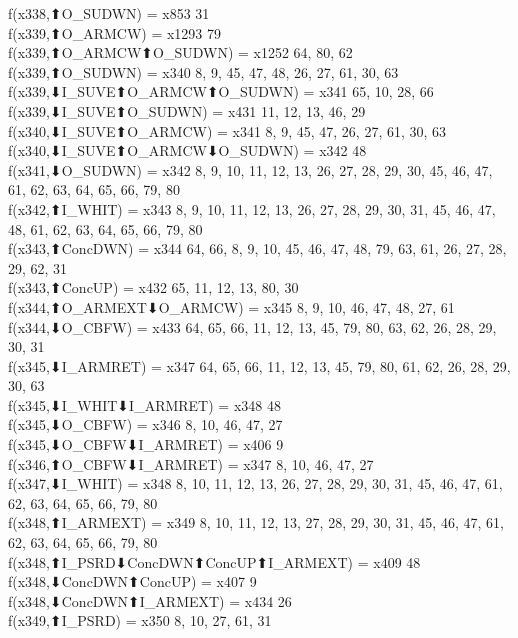 f(x338,⬆O_SUDWN) = x853 {31} \\
f(x339,⬆O_ARMCW) = x1293 {79} \\
f(x339,⬆O_ARMCW⬆O_SUDWN) = x1252 {64, 80, 62} \\
f(x339,⬆O_SUDWN) = x340 {8, 9, 45, 47, 48, 26, 27, 61, 30, 63} \\
f(x339,⬇I_SUVE⬆O_ARMCW⬆O_SUDWN) = x341 {65, 10, 28, 66} \\
f(x339,⬇I_SUVE⬆O_SUDWN) = x431 {11, 12, 13, 46, 29} \\
f(x340,⬇I_SUVE⬆O_ARMCW) = x341 {8, 9, 45, 47, 26, 27, 61, 30, 63} \\
f(x340,⬇I_SUVE⬆O_ARMCW⬇O_SUDWN) = x342 {48} \\
f(x341,⬇O_SUDWN) = x342 {8, 9, 10, 11, 12, 13, 26, 27, 28, 29, 30, 45, 46, 47, 61, 62, 63, 64, 65, 66, 79, 80} \\
f(x342,⬆I_WHIT) = x343 {8, 9, 10, 11, 12, 13, 26, 27, 28, 29, 30, 31, 45, 46, 47, 48, 61, 62, 63, 64, 65, 66, 79, 80} \\
f(x343,⬆ConcDWN) = x344 {64, 66, 8, 9, 10, 45, 46, 47, 48, 79, 63, 61, 26, 27, 28, 29, 62, 31} \\
f(x343,⬆ConcUP) = x432 {65, 11, 12, 13, 80, 30} \\
f(x344,⬆O_ARMEXT⬇O_ARMCW) = x345 {8, 9, 10, 46, 47, 48, 27, 61} \\
f(x344,⬇O_CBFW) = x433 {64, 65, 66, 11, 12, 13, 45, 79, 80, 63, 62, 26, 28, 29, 30, 31} \\
f(x345,⬇I_ARMRET) = x347 {64, 65, 66, 11, 12, 13, 45, 79, 80, 61, 62, 26, 28, 29, 30, 63} \\
f(x345,⬇I_WHIT⬇I_ARMRET) = x348 {48} \\
f(x345,⬇O_CBFW) = x346 {8, 10, 46, 47, 27} \\
f(x345,⬇O_CBFW⬇I_ARMRET) = x406 {9} \\
f(x346,⬆O_CBFW⬇I_ARMRET) = x347 {8, 10, 46, 47, 27} \\
f(x347,⬇I_WHIT) = x348 {8, 10, 11, 12, 13, 26, 27, 28, 29, 30, 31, 45, 46, 47, 61, 62, 63, 64, 65, 66, 79, 80} \\
f(x348,⬆I_ARMEXT) = x349 {8, 10, 11, 12, 13, 27, 28, 29, 30, 31, 45, 46, 47, 61, 62, 63, 64, 65, 66, 79, 80} \\
f(x348,⬆I_PSRD⬇ConcDWN⬆ConcUP⬆I_ARMEXT) = x409 {48} \\
f(x348,⬇ConcDWN⬆ConcUP) = x407 {9} \\
f(x348,⬇ConcDWN⬆I_ARMEXT) = x434 {26} \\
f(x349,⬆I_PSRD) = x350 {8, 10, 27, 61, 31} \\
